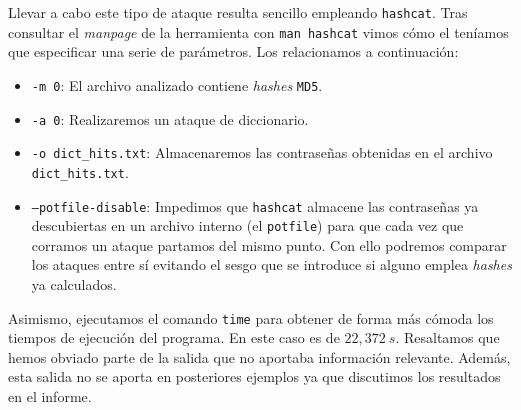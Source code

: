 \documentclass{article}
\begin{document}
            Llevar a cabo este tipo de ataque resulta sencillo empleando \texttt{hashcat}. Tras consultar el \textit{manpage} de la herramienta con \texttt{man hashcat} vimos cómo el teníamos que especificar una serie de parámetros. Los relacionamos a continuación:

            \begin{itemize}
                \item \texttt{-m 0}: El archivo analizado contiene \textit{hashes} \texttt{MD5}.
                \item \texttt{-a 0}: Realizaremos un ataque de diccionario.
                \item \texttt{-o dict\_hits.txt}: Almacenaremos las contraseñas obtenidas en el archivo \texttt{dict\_hits.txt}.
                \item \texttt{--potfile-disable}: Impedimos que \texttt{hashcat} almacene las contraseñas ya descubiertas en un archivo interno (el \texttt{potfile}) para que cada vez que corramos un ataque partamos del mismo punto. Con ello podremos comparar los ataques entre sí evitando el sesgo que se introduce si alguno emplea \textit{hashes} ya calculados.
            \end{itemize}

            Asimismo, ejecutamos el comando \texttt{time} para obtener de forma más cómoda los tiempos de ejecución del programa. En este caso es de $22,372\ s$. Resaltamos que hemos obviado parte de la salida que no aportaba información relevante. Además, esta salida no se aporta en posteriores ejemplos ya que discutimos los resultados en el informe.
\end{document}
